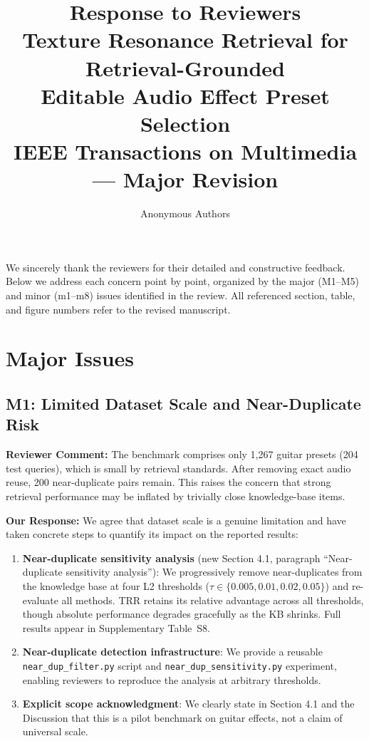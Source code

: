 \documentclass[11pt]{article}
\title{Response to Reviewers\\
\large Texture Resonance Retrieval for Retrieval-Grounded\\Editable Audio Effect Preset Selection\\
\large IEEE Transactions on Multimedia --- Major Revision}
\author{Anonymous Authors}
\date{}
\newcommand{\reviewer}[1]{\textcolor{reviewercolor}{\textbf{Reviewer Comment:} #1}}
\newcommand{\response}[1]{\textcolor{responsecolor}{\textbf{Our Response:} #1}}
\begin{document}
\maketitle

We sincerely thank the reviewers for their detailed and constructive feedback. Below we address each concern point by point, organized by the major (M1--M5) and minor (m1--m8) issues identified in the review. All referenced section, table, and figure numbers refer to the revised manuscript.

\section*{Major Issues}

\subsection*{M1: Limited Dataset Scale and Near-Duplicate Risk}

\reviewer{The benchmark comprises only 1,267 guitar presets (204 test queries), which is small by retrieval standards. After removing exact audio reuse, 200 near-duplicate pairs remain. This raises the concern that strong retrieval performance may be inflated by trivially close knowledge-base items.}

\response{We agree that dataset scale is a genuine limitation and have taken concrete steps to quantify its impact on the reported results:}

\begin{enumerate}[leftmargin=*]
\item \textbf{Near-duplicate sensitivity analysis} (new Section 4.1, paragraph ``Near-duplicate sensitivity analysis''): We progressively remove near-duplicates from the knowledge base at four L2 thresholds ($\tau \in \{0.005, 0.01, 0.02, 0.05\}$) and re-evaluate all methods. TRR retains its relative advantage across all thresholds, though absolute performance degrades gracefully as the KB shrinks. Full results appear in Supplementary Table~S8.
\item \textbf{Near-duplicate detection infrastructure}: We provide a reusable \texttt{near\_dup\_filter.py} script and \texttt{near\_dup\_sensitivity.py} experiment, enabling reviewers to reproduce the analysis at arbitrary thresholds.
\item \textbf{Explicit scope acknowledgment}: We clearly state in Section 4.1 and the Discussion that this is a pilot benchmark on guitar effects, not a claim of universal scale.
\end{enumerate}
\end{document}
